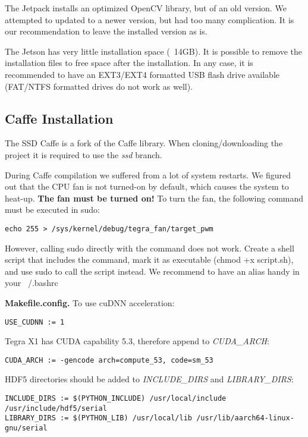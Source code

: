 The Jetpack installs an optimized OpenCV library, but of an old version. We attempted to updated to a newer version, but had too many complication. It is our recommendation to leave the installed version as is.

The Jetson has very little installation space (~14GB). It is possible to remove the installation files to free space after the installation. In any case, it is recommended to have an EXT3/EXT4 formatted USB flash drive available (FAT/NTFS formatted drives do not work as well). 

\subsection{Caffe Installation}

The SSD Caffe\cite{caffessd} is a fork of the Caffe library\cite{caffeoriginal}. When cloning/downloading the project it is required to use the \textit{ssd} branch.

During Caffe compilation we suffered from a lot of system restarts. We figured out that the CPU fan is not turned-on by default, which causes the system to heat-up. \textbf{The fan must be turned on!} To turn the fan, the following command must be executed in sudo:
\begin{lstlisting} 
echo 255 > /sys/kernel/debug/tegra_fan/target_pwm
\end{lstlisting}
However, calling sudo directly with the command does not work. Create a shell script that includes the command, mark it as executable (chmod +x script.sh), and use sudo to call the script instead. We recommend to have an alias handy in your ~/.bashrc 

\textbf{Makefile.config.}
To use cuDNN acceleration:
\begin{lstlisting} 
USE_CUDNN := 1
\end{lstlisting}

Tegra X1 has CUDA capability 5.3, therefore append to \textit{CUDA\_ARCH}: 
\begin{lstlisting} 
CUDA_ARCH := -gencode arch=compute_53, code=sm_53
\end{lstlisting}

HDF5 directories should be added to \textit{INCLUDE\_DIRS} and \textit{LIBRARY\_DIRS}:
\begin{lstlisting} 
INCLUDE_DIRS := $(PYTHON_INCLUDE) /usr/local/include /usr/include/hdf5/serial
LIBRARY_DIRS := $(PYTHON_LIB) /usr/local/lib /usr/lib/aarch64-linux-gnu/serial
\end{lstlisting}

